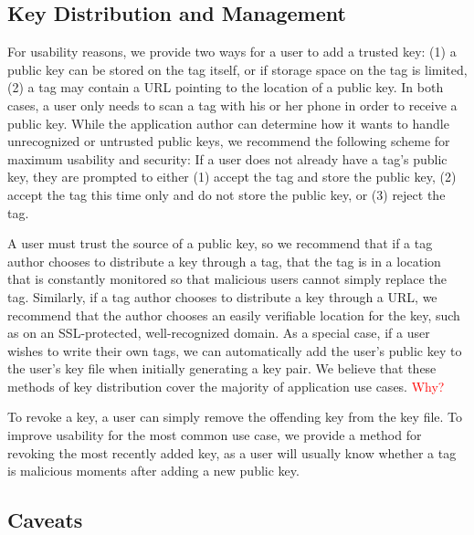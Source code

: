 \documentclass[12pt]{article}
\newcommand\TODO[1]{\textcolor{red}{#1}}
\begin{document}
\subsection{Key Distribution and Management}
% 
% 

For usability reasons, we provide two ways for a user to add a trusted key: (1) a public key can be stored on the tag itself, or if storage space on the tag is limited, (2) a tag may contain a URL pointing to the location of a public key.
In both cases, a user only needs to scan a tag with his or her phone in order to receive a public key.
While the application author can determine how it wants to handle unrecognized or untrusted public keys, we recommend the following scheme for maximum usability and security:
If a user does not already have a tag's public key, they are prompted to either (1) accept the tag and store the public key, (2) accept the tag this time only and do not store the public key, or (3) reject the tag.

A user must trust the source of a public key, so we recommend that if a tag author chooses to distribute a key through a tag, that the tag is in a location that is constantly monitored so that malicious users cannot simply replace the tag.
Similarly, if a tag author chooses to distribute a key through a URL, we recommend that the author chooses an easily verifiable location for the key, such as on an SSL-protected, well-recognized domain.
As a special case, if a user wishes to write their own tags, we can automatically add the user's public key to the user's key file when initially generating a key pair.  
We believe that these methods of key distribution cover the majority of application use cases. \TODO{Why?}

To revoke a key, a user can simply remove the offending key from the key file.
To improve usability for the most common use case, we provide a method for revoking the most recently added key, as a user will usually know whether a tag is malicious moments after adding a new public key.

\subsection{Caveats}
\end{document}
